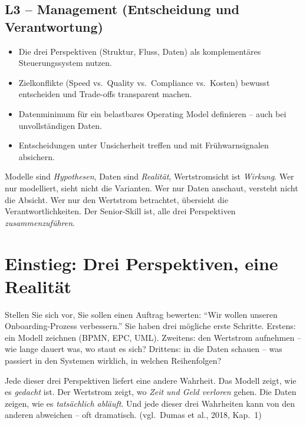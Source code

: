 \documentclass[11pt,a4paper,oneside]{article}
\newcommand{\quelle}[1]{{\footnotesize\color{lpGray}(#1)}}
\begin{document}
\subsection*{L3 -- Management (Entscheidung und Verantwortung)}
\begin{itemize}
  \item Die drei Perspektiven (Struktur, Fluss, Daten) als komplementäres Steuerungssystem nutzen.
  \item Zielkonflikte (Speed vs.\ Quality vs.\ Compliance vs.\ Kosten) bewusst entscheiden und Trade-offs transparent machen.
  \item Datenminimum für ein belastbares Operating Model definieren -- auch bei unvollständigen Daten.
  \item Entscheidungen unter Unsicherheit treffen und mit Frühwarnsignalen absichern.
\end{itemize}

\begin{merkbox}
Modelle sind \emph{Hypothesen}, Daten sind \emph{Realität}, Wertstromsicht ist \emph{Wirkung}. Wer nur modelliert, sieht nicht die Varianten. Wer nur Daten anschaut, versteht nicht die Absicht. Wer nur den Wertstrom betrachtet, übersieht die Verantwortlichkeiten. Der Senior-Skill ist, alle drei Perspektiven \emph{zusammenzuführen}.
\end{merkbox}

\clearpage

\section{Einstieg: Drei Perspektiven, eine Realität}

Stellen Sie sich vor, Sie sollen einen Auftrag bewerten: ``Wir wollen unseren Onboarding-Prozess verbessern.'' Sie haben drei mögliche erste Schritte. Erstens: ein Modell zeichnen (BPMN, EPC, UML). Zweitens: den Wertstrom aufnehmen -- wie lange dauert was, wo staut es sich? Drittens: in die Daten schauen -- was passiert in den Systemen wirklich, in welchen Reihenfolgen?

Jede dieser drei Perspektiven liefert eine andere Wahrheit. Das Modell zeigt, wie es \emph{gedacht} ist. Der Wertstrom zeigt, wo \emph{Zeit und Geld verloren} gehen. Die Daten zeigen, wie es \emph{tatsächlich abläuft}. Und jede dieser drei Wahrheiten kann von den anderen abweichen -- oft dramatisch. \quelle{vgl.\ Dumas et al., 2018, Kap.~1}
\end{document}
